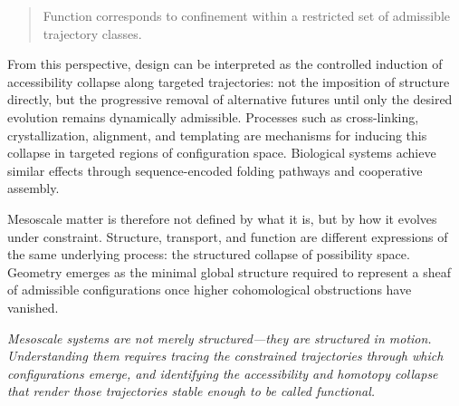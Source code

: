 \documentclass[11pt, a4paper, twocolumn]{article}
\begin{document}
\begin{quote}
Function corresponds to confinement within a restricted set of admissible
trajectory classes.
\end{quote}

From this perspective, design can be interpreted as the controlled induction of
accessibility collapse along targeted trajectories: not the imposition of
structure directly, but the progressive removal of alternative futures until
only the desired evolution remains dynamically admissible. Processes such as
cross-linking, crystallization, alignment, and templating are mechanisms for
inducing this collapse in targeted regions of configuration space. Biological
systems achieve similar effects through sequence-encoded folding pathways and
cooperative assembly.

Mesoscale matter is therefore not defined by what it is, but by how it evolves
under constraint. Structure, transport, and function are different expressions
of the same underlying process: the structured collapse of possibility space.
Geometry emerges as the minimal global structure required to represent a sheaf
of admissible configurations once higher cohomological obstructions have
vanished.

\bigskip

\noindent\textit{Mesoscale systems are not merely structured---they are
structured in motion. Understanding them requires tracing the constrained
trajectories through which configurations emerge, and identifying the
accessibility and homotopy collapse that render those trajectories stable
enough to be called functional.}

\newpage
\end{document}
